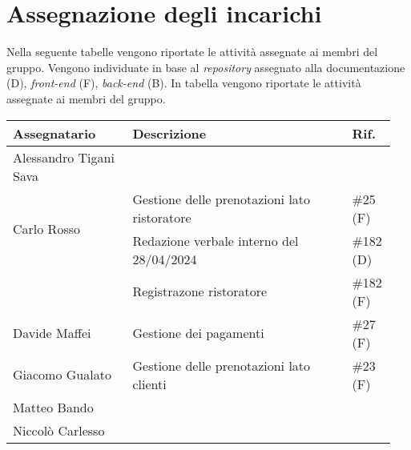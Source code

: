 \section{Assegnazione degli incarichi}
Nella seguente tabelle vengono riportate le attività assegnate ai membri del 
gruppo. Vengono individuate in base al \textit{repository} assegnato alla 
documentazione (D), \textit{front-end} (F), \textit{back-end} (B).
In tabella vengono riportate le attività assegnate ai membri del gruppo.
\begin{center}
	{
		\renewcommand{\arraystretch}{1.5}
		\begin{tabular}{p{0.30\linewidth}|p{0.55\linewidth}|p{0.10\linewidth}}
			\textbf{Assegnatario}        & \textbf{Descrizione} & \textbf{Rif.} \\

			\hline
			Alessandro Tigani Sava       &                      &               \\
			\hline
			\multirow{2}{*}{Carlo Rosso} & Gestione delle prenotazioni lato ristoratore                     & \#25 (F)              \\
			\cline{2-3}
			                             & Redazione verbale interno del 28/04/2024							& \#182 (D)             \\
			\cline{2-3}
			                             & Registrazone ristoratore											& \#182 (F)             \\

			\hline
			Davide Maffei                & Gestione dei pagamenti											& \#27 (F)              \\
			\hline
			Giacomo Gualato				 & Gestione delle prenotazioni lato clienti							& \#23 (F)				\\
			\hline
			Matteo Bando                 &                      &               \\
			\hline
			Niccolò Carlesso             &                      &               \\
			\hline
		\end{tabular}
	}
\end{center}
